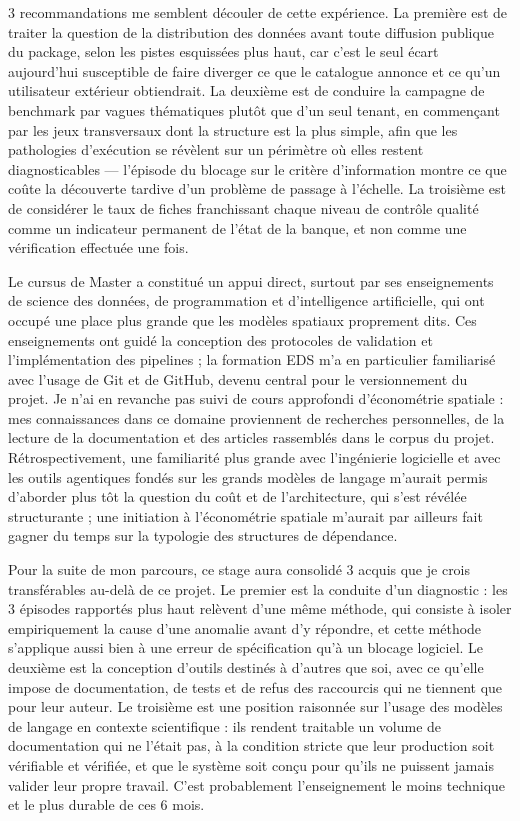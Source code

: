 \documentclass[11pt,a4paper]{article}
\begin{document}
3 recommandations me semblent découler de cette expérience. La première est de traiter la question de la distribution des données avant toute diffusion publique du package, selon les pistes esquissées plus haut, car c'est le seul écart aujourd'hui susceptible de faire diverger ce que le catalogue annonce et ce qu'un utilisateur extérieur obtiendrait. La deuxième est de conduire la campagne de benchmark par vagues thématiques plutôt que d'un seul tenant, en commençant par les jeux transversaux dont la structure est la plus simple, afin que les pathologies d'exécution se révèlent sur un périmètre où elles restent diagnosticables --- l'épisode du blocage sur le critère d'information montre ce que coûte la découverte tardive d'un problème de passage à l'échelle. La troisième est de considérer le taux de fiches franchissant chaque niveau de contrôle qualité comme un indicateur permanent de l'état de la banque, et non comme une vérification effectuée une fois.

Le cursus de Master a constitué un appui direct, surtout par ses enseignements de science des données, de programmation et d'intelligence artificielle, qui ont occupé une place plus grande que les modèles spatiaux proprement dits. Ces enseignements ont guidé la conception des protocoles de validation et l'implémentation des pipelines ; la formation EDS m'a en particulier familiarisé avec l'usage de Git et de GitHub, devenu central pour le versionnement du projet. Je n'ai en revanche pas suivi de cours approfondi d'économétrie spatiale : mes connaissances dans ce domaine proviennent de recherches personnelles, de la lecture de la documentation et des articles rassemblés dans le corpus du projet. Rétrospectivement, une familiarité plus grande avec l'ingénierie logicielle et avec les outils agentiques fondés sur les grands modèles de langage m'aurait permis d'aborder plus tôt la question du coût et de l'architecture, qui s'est révélée structurante ; une initiation à l'économétrie spatiale m'aurait par ailleurs fait gagner du temps sur la typologie des structures de dépendance.

Pour la suite de mon parcours, ce stage aura consolidé 3 acquis que je crois transférables au-delà de ce projet. Le premier est la conduite d'un diagnostic : les 3 épisodes rapportés plus haut relèvent d'une même méthode, qui consiste à isoler empiriquement la cause d'une anomalie avant d'y répondre, et cette méthode s'applique aussi bien à une erreur de spécification qu'à un blocage logiciel. Le deuxième est la conception d'outils destinés à d'autres que soi, avec ce qu'elle impose de documentation, de tests et de refus des raccourcis qui ne tiennent que pour leur auteur. Le troisième est une position raisonnée sur l'usage des modèles de langage en contexte scientifique : ils rendent traitable un volume de documentation qui ne l'était pas, à la condition stricte que leur production soit vérifiable et vérifiée, et que le système soit conçu pour qu'ils ne puissent jamais valider leur propre travail. C'est probablement l'enseignement le moins technique et le plus durable de ces 6 mois.
\end{document}
